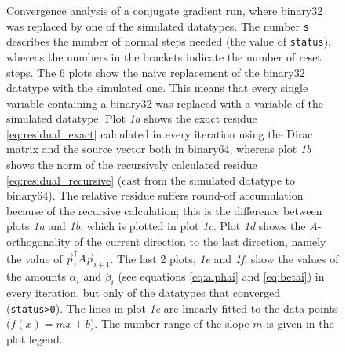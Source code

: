 \documentclass{article}
\theoremstyle{plain} %
\theoremstyle{convention} %
\theoremstyle{remark} %
\def\code#1{\texttt{#1}}
\numberwithin{equation}{section}
\begin{document}
\begin{figure}
    \caption{Convergence analysis of a conjugate gradient run, where \gls{binary32} was replaced by one of the simulated datatypes. The number \code{s} describes the number of normal steps needed (the value of \code{status}), whereas the numbers in the brackets indicate the number of reset steps. The 6 plots show the naive replacement of the \gls{binary32} datatype with the simulated one. This means that every single variable containing a \gls{binary32} was replaced with a variable of the simulated datatype. Plot \textit{1a} shows the exact residue \eqref{eq:residual_exact} calculated in every iteration using the Dirac matrix and the source vector both in \gls{binary64}, whereas plot \textit{1b} shows the norm of the recursively calculated residue \eqref{eq:residual_recursive} (cast from the simulated datatype to \gls{binary64}). The relative residue suffers round-off accumulation because of the recursive calculation; this is the difference between plots \textit{1a} and \textit{1b}, which is plotted in plot \textit{1c}. Plot \textit{1d} shows the $A$-orthogonality of the current direction to the last direction, namely the value of $\vec{p}_{i}^\dagger A \vec{p}_{i+1}$. The last 2 plots, \textit{1e} and \textit{1f}, show the values of the amounts $\alpha_i$ and $\beta_i$ (see equations \eqref{eq:alphai} and \eqref{eq:betai}) in every iteration, but only of the datatypes that converged (\code{status>0}). The lines in plot \textit{1e} are linearly fitted to the data points ($f(x) = m x + b$). The number range of the slope $m$ is given in the plot legend.}
    \label{fig:cgne:naive}
\end{figure}
\end{document}
